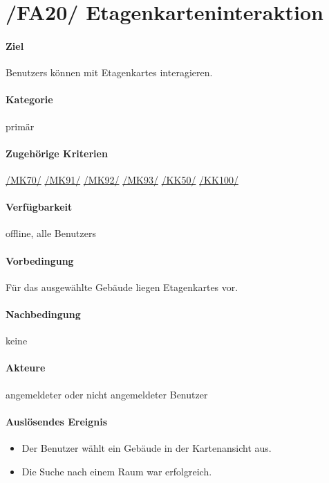 \section[Etagenkarteninteraktion]{/FA20/ Etagenkarteninteraktion}
\label{/FA20/}
\paragraph{Ziel}
\Glspl{Benutzer} können mit \Glspl{Etagenkarte} interagieren.
\paragraph{Kategorie}
primär
\paragraph{Zugehörige Kriterien}
\hyperref[/MK70/]{/MK70/} \hyperref[/MK91/]{/MK91/} \hyperref[/MK92/]{/MK92/} \hyperref[/MK93/]{/MK93/} \hyperref[/KK50/]{/KK50/} \hyperref[/KK100/]{/KK100/}
\paragraph{Verfügbarkeit}
\gls{offline}, alle \Glspl{Benutzer}
\paragraph{Vorbedingung}
Für das ausgewählte Gebäude liegen \Glspl{Etagenkarte} vor.
\paragraph{Nachbedingung}
keine
\paragraph{Akteure}
angemeldeter oder nicht angemeldeter \Gls{Benutzer}
\paragraph{Auslösendes Ereignis}
\begin{itemize}
    \item Der \Gls{Benutzer} wählt ein Gebäude in der \Gls{Kartenansicht} aus.
    \item Die Suche nach einem Raum war erfolgreich.
\end{itemize}
 

